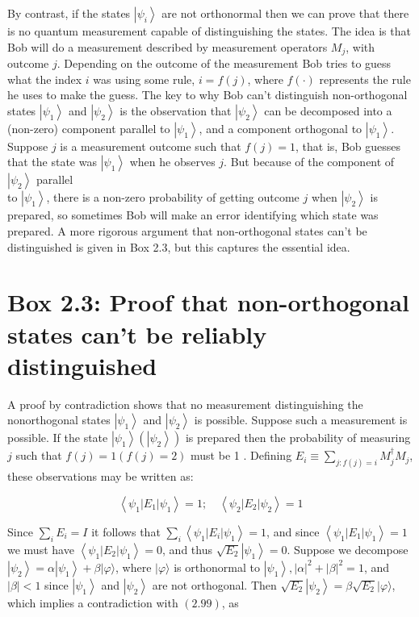 \documentclass[10pt]{article}
\begin{document}
By contrast, if the states $\left|\psi_{i}\right\rangle$ are not orthonormal then we can prove that there is no quantum measurement capable of distinguishing the states. The idea is that Bob will do a measurement described by measurement operators $M_{j}$, with outcome $j$. Depending on the outcome of the measurement Bob tries to guess what the index $i$ was using some rule, $i=f(j)$, where $f(\cdot)$ represents the rule he uses to make the guess. The key to why Bob can't distinguish non-orthogonal states $\left|\psi_{1}\right\rangle$ and $\left|\psi_{2}\right\rangle$ is the observation that $\left|\psi_{2}\right\rangle$ can be decomposed into a (non-zero) component parallel to $\left|\psi_{1}\right\rangle$, and a component orthogonal to $\left|\psi_{1}\right\rangle$. Suppose $j$ is a measurement outcome such that $f(j)=1$, that is, Bob guesses that the state was $\left|\psi_{1}\right\rangle$ when he observes $j$. But because of the component of $\left|\psi_{2}\right\rangle$ parallel\\
to $\left|\psi_{1}\right\rangle$, there is a non-zero probability of getting outcome $j$ when $\left|\psi_{2}\right\rangle$ is prepared, so sometimes Bob will make an error identifying which state was prepared. A more rigorous argument that non-orthogonal states can't be distinguished is given in Box 2.3, but this captures the essential idea.

\section*{Box 2.3: Proof that non-orthogonal states can't be reliably distinguished}
A proof by contradiction shows that no measurement distinguishing the nonorthogonal states $\left|\psi_{1}\right\rangle$ and $\left|\psi_{2}\right\rangle$ is possible. Suppose such a measurement is possible. If the state $\left|\psi_{1}\right\rangle\left(\left|\psi_{2}\right\rangle\right)$ is prepared then the probability of measuring $j$ such that $f(j)=1(f(j)=2)$ must be 1 . Defining $E_{i} \equiv \sum_{j: f(j)=i} M_{j}^{\dagger} M_{j}$, these observations may be written as:


\begin{equation*}
\left\langle\psi_{1}\left|E_{1}\right| \psi_{1}\right\rangle=1 ; \quad\left\langle\psi_{2}\left|E_{2}\right| \psi_{2}\right\rangle=1 \tag{2.99}
\end{equation*}


Since $\sum_{i} E_{i}=I$ it follows that $\sum_{i}\left\langle\psi_{1}\left|E_{i}\right| \psi_{1}\right\rangle=1$, and since $\left\langle\psi_{1}\left|E_{1}\right| \psi_{1}\right\rangle=1$ we must have $\left\langle\psi_{1}\left|E_{2}\right| \psi_{1}\right\rangle=0$, and thus $\sqrt{E_{2}}\left|\psi_{1}\right\rangle=0$. Suppose we decompose $\left|\psi_{2}\right\rangle=\alpha\left|\psi_{1}\right\rangle+\beta|\varphi\rangle$, where $|\varphi\rangle$ is orthonormal to $\left|\psi_{1}\right\rangle,|\alpha|^{2}+|\beta|^{2}=1$, and $|\beta|<1$ since $\left|\psi_{1}\right\rangle$ and $\left|\psi_{2}\right\rangle$ are not orthogonal. Then $\sqrt{E_{2}}\left|\psi_{2}\right\rangle=\beta \sqrt{E_{2}}|\varphi\rangle$, which implies a contradiction with $(2.99)$, as
\end{document}

